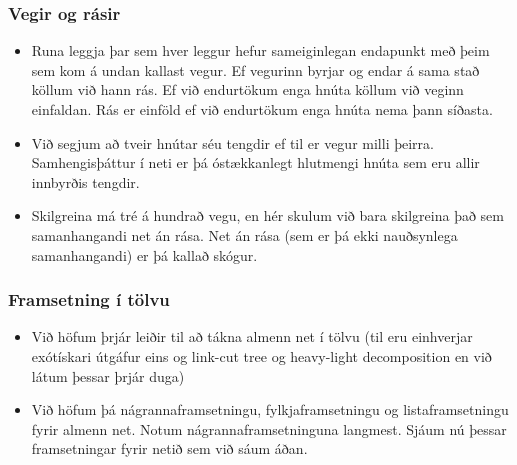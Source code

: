 \documentclass{beamer}
\begin{document}
\begin{frame}
\frametitle{Vegir og rásir}

\begin{itemize}

\item<1-> Runa leggja þar sem hver leggur hefur sameiginlegan endapunkt með þeim sem kom á undan kallast vegur. Ef vegurinn byrjar og endar á sama stað köllum við hann rás. Ef við endurtökum enga hnúta köllum við veginn einfaldan. Rás er einföld ef við endurtökum enga hnúta nema þann síðasta.

\item<2-> Við segjum að tveir hnútar séu tengdir ef til er vegur milli þeirra. Samhengisþáttur í neti er þá óstækkanlegt hlutmengi hnúta sem eru allir innbyrðis tengdir.

\item<3-> Skilgreina má tré á hundrað vegu, en hér skulum við bara skilgreina það sem samanhangandi net án rása. Net án rása (sem er þá ekki nauðsynlega samanhangandi) er þá kallað skógur.

\end{itemize}

\end{frame}

\begin{frame}
\frametitle{Framsetning í tölvu}

\begin{itemize}

\item<1-> Við höfum þrjár leiðir til að tákna almenn net í tölvu (til eru einhverjar exótískari útgáfur eins og link-cut tree og heavy-light decomposition en við látum þessar þrjár duga)

\item<2-> Við höfum þá nágrannaframsetningu, fylkjaframsetningu og listaframsetningu fyrir almenn net. Notum nágrannaframsetninguna langmest. Sjáum nú þessar framsetningar fyrir netið sem við sáum áðan.

\end{itemize}

\end{frame}
\end{document}
